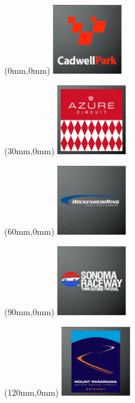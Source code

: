 \begin{textblock*}{30mm}(0mm,0mm)%
\includegraphics[width=30mm]{LG/2015-05-20_00076.png}
\end{textblock*}
\begin{textblock*}{30mm}(30mm,0mm)%
\includegraphics[width=30mm]{LG/2015-05-20_00072.png}
\end{textblock*}
\begin{textblock*}{30mm}(60mm,0mm)%
\includegraphics[width=30mm]{LG/2015-05-20_00082.png}
\end{textblock*}
\begin{textblock*}{30mm}(90mm,0mm)%
\includegraphics[width=30mm]{LG/2015-05-20_00096.png}
\end{textblock*}
\begin{textblock*}{30mm}(120mm,0mm)%
\includegraphics[width=30mm]{LG/2015-05-20_00087.png}
\end{textblock*}
